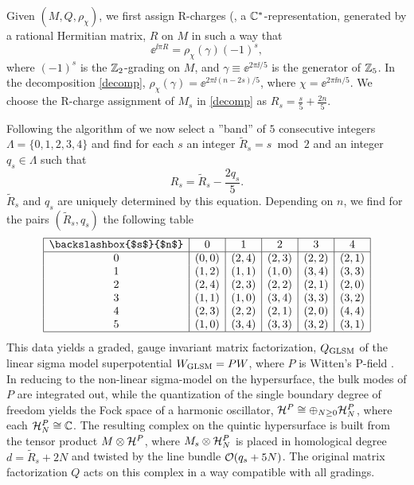 Given $(M,Q,\rho_\chi)$, we first assign R-charges (\ie, a ${\mathbb C}^*$-representation, 
generated by a rational Hermitian matrix, $R$ on $M$ in such a way that
\begin{equation}
\ee^{\ii\pi R} = \rho_\chi(\gamma) (-1)^s ,
\end{equation}
where $(-1)^s$ is the ${\mathbb Z}_2$-grading on $M$, and $\gamma\equiv \ee^{2\pi\ii/5}$ is 
the generator of ${\mathbb Z}_5$. In the decomposition \eqref{decomp}, $\rho_\chi(\gamma)=
\ee^{2\pi\ii(n-2s)/5}$, where $\chi=\ee^{2\pi\ii n/5}$. We choose the R-charge
assignment of $M_s$ in \eqref{decomp} as $R_s=\frac s5+\frac{2n}5$.

Following the algorithm of \cite{hhp} we now select a ''band'' of $5$ consecutive 
integers $\Lambda=\{0,1,2,3,4\}$ and find for each $s$ an integer $\tilde R_s=s\bmod 2$ 
and an integer $q_s\in\Lambda$ such that
\begin{equation}
R_s = \tilde R_s - \frac{2q_s}5 .
\end{equation}
$\tilde R_s$ and $q_s$ are uniquely determined by this equation. Depending on $n$, we
find for the pairs $(\tilde R_s,q_s)$ the following table
\begin{equation}
\begin{array}{|c|c|c|c|c|c|}
\hline
\text{\backslashbox{$s$}{$n$}} & 0   & 1     & 2     & 3     & 4     \\\hline
0 & (0,0) & (2,4) & (2,3) & (2,2) & (2,1) \\
1 & (1,2) & (1,1) & (1,0) & (3,4) & (3,3) \\
2 & (2,4) & (2,3) & (2,2) & (2,1) & (2,0) \\
3 & (1,1) & (1,0) & (3,4) & (3,3) & (3,2) \\
4 & (2,3) & (2,2) & (2,1) & (2,0) & (4,4) \\
5 & (1,0) & (3,4) & (3,3) & (3,2) & (3,1) \\\hline
\end{array}
\end{equation}
This data yields a graded, gauge invariant matrix factorization, $Q_{\rm GLSM}$ of the 
linear sigma model superpotential $W_{\rm GLSM}=P W$, where $P$ is Witten's P-field
\cite{Witten:1993yc}. In reducing to the non-linear sigma-model on the hypersurface,
the bulk modes of $P$ are integrated out, while the quantization of the single
boundary degree of freedom yields the Fock space of a harmonic oscillator, 
${\cal H}^P\cong \oplus_{N\ge 0} {\cal H}^P_N$, where each ${\cal H}^P_N\cong{\mathbb C}$. 
The resulting complex on the quintic hypersurface is built from the tensor
product $M\otimes {\cal H}^P$, where $M_s\otimes{\cal H}^P_N$ is placed in homological
degree $d=\tilde R_s+2N$ and twisted by the line bundle ${\cal O}(q_s+5N)$.
The original matrix factorization $Q$ acts on this complex in a way compatible
with all gradings.

